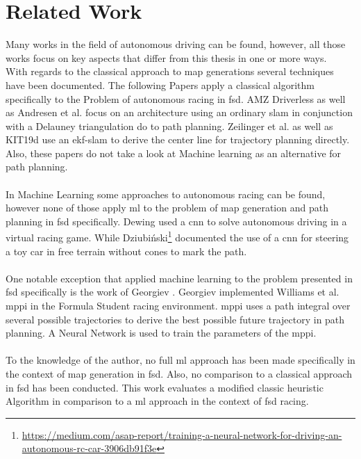 \section{Related Work}
Many works in the field of autonomous driving can be found, however, all those works focus on key aspects that differ from this thesis in one or more ways. \\
With regards to the classical approach to map generations several techniques have been documented. The following Papers apply a classical algorithm specifically to the Problem of autonomous racing in \ac{fsd}. AMZ Driverless \cite{kabzan2019amz} as well as Andresen et al. \cite{andresen2020} focus on an architecture using an ordinary \ac{slam} in conjunction with a Delauney triangulation do to path planning. Zeilinger et al. \cite{zeilinger2017} as well as KIT19d \cite{nekkah2020} use an \ac{ekf}-\ac{slam} to derive the center line for trajectory planning directly. Also, these papers do not take a look at Machine learning as an alternative for path planning.\\
\\
In Machine Learning some approaches to autonomous racing can be found, however none of those apply \ac{ml} to the problem of map generation and path planning in \ac{fsd} specifically. Dewing \cite{DewingNowTI}
used a \ac{cnn} to solve autonomous driving in a virtual racing game. While Dziubiński\footnote{\url{https://medium.com/asap-report/training-a-neural-network-for-driving-an-autonomous-rc-car-3906db91f3e}} documented the use of a \ac{cnn} for steering a toy car in free terrain without cones to mark the path.\\
\\
One notable exception that applied machine learning to the problem presented in \ac{fsd} specifically is the work of Georgiev \cite{georgiev2019}. Georgiev implemented Williams et al. \cite{williams2016} \ac{mppi} in the Formula Student racing environment. \ac{mppi} uses a path integral over several possible trajectories to derive the best possible future trajectory in path planning. A Neural Network is used to train the parameters of the \ac{mppi}.\\
\\
To the knowledge of the author, no full \ac{ml} approach has been made specifically in the context of map generation in \ac{fsd}. Also, no comparison to a classical approach in \ac{fsd} has been conducted. This work evaluates a modified classic heuristic Algorithm in comparison to a \ac{ml} approach in the context of \ac{fsd} racing.

